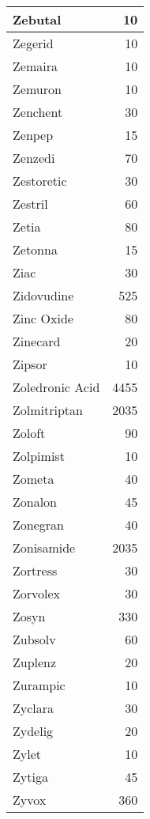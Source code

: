 \documentclass[
]{article}
\newenvironment{Shaded}{\begin{snugshade}}{\end{snugshade}}
\newcommand{\DataTypeTok}[1]{\textcolor[rgb]{0.13,0.29,0.53}{#1}}
\newcommand{\KeywordTok}[1]{\textcolor[rgb]{0.13,0.29,0.53}{\textbf{#1}}}
\newcommand{\NormalTok}[1]{#1}
\newcommand{\OperatorTok}[1]{\textcolor[rgb]{0.81,0.36,0.00}{\textbf{#1}}}
\newcommand{\StringTok}[1]{\textcolor[rgb]{0.31,0.60,0.02}{#1}}
\begin{document}
\begin{table}
\begin{tabular}[t]{l|r}
\hline
Zebutal & 10\\
\hline
Zegerid & 10\\
\hline
Zemaira & 10\\
\hline
Zemuron & 10\\
\hline
Zenchent & 30\\
\hline
Zenpep & 15\\
\hline
Zenzedi & 70\\
\hline
Zestoretic & 30\\
\hline
Zestril & 60\\
\hline
Zetia & 80\\
\hline
Zetonna & 15\\
\hline
Ziac & 30\\
\hline
Zidovudine & 525\\
\hline
Zinc Oxide & 80\\
\hline
Zinecard & 20\\
\hline
Zipsor & 10\\
\hline
Zoledronic Acid & 4455\\
\hline
Zolmitriptan & 2035\\
\hline
Zoloft & 90\\
\hline
Zolpimist & 10\\
\hline
Zometa & 40\\
\hline
Zonalon & 45\\
\hline
Zonegran & 40\\
\hline
Zonisamide & 2035\\
\hline
Zortress & 30\\
\hline
Zorvolex & 30\\
\hline
Zosyn & 330\\
\hline
Zubsolv & 60\\
\hline
Zuplenz & 20\\
\hline
Zurampic & 10\\
\hline
Zyclara & 30\\
\hline
Zydelig & 20\\
\hline
Zylet & 10\\
\hline
Zytiga & 45\\
\hline
Zyvox & 360\\
\hline
\end{tabular}
\end{table}

\begin{Shaded}
\end{Shaded}
\end{document}
